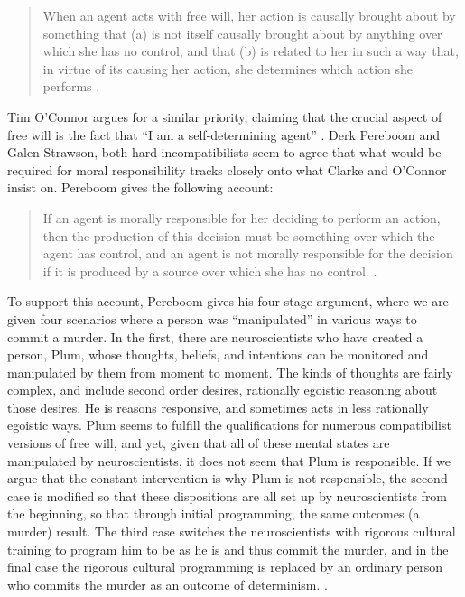 \documentclass[phd,12pt,oneside,paper=letterpaper]{ubcthesis}
\begin{document}
\begin{quote}
When an agent acts with free will, her action is causally brought about by something that (a)  is not itself causally brought about by anything over which she has no control, and that (b) is related to her in such a way that, in virtue of its causing her action, she determines which action she performs \citep{clarke1993}.
\end{quote}

Tim O'Connor argues for a similar priority, claiming that the crucial aspect of free will is the fact that ``I am a self-determining agent'' \citep[p.210]{oconnor2005}. Derk Pereboom and Galen Strawson, both hard incompatibilists seem to agree that what would be required for moral responsibility tracks closely onto what Clarke and O'Connor insist on. Pereboom gives the following account:

\begin{quote}
If an agent is morally responsible for her deciding to perform an action, then the production of this decision must be something over which the agent has control, and an agent is not morally responsible for the decision if it is produced by a source over which she has no control. \citep{pereboom2001}.
\end{quote}

To support this account, Pereboom gives his four-stage argument, where we are given four scenarios where a person was ``manipulated'' in various ways to commit a murder. In the first, there are neuroscientists who have created a person, Plum, whose thoughts, beliefs, and intentions can be monitored and manipulated by them from moment to moment. The kinds of thoughts are fairly complex, and include second order desires, rationally egoistic reasoning about those desires. He is reasons responsive, and sometimes acts in less rationally egoistic ways. Plum seems to fulfill the qualifications for numerous compatibilist versions of free will, and yet, given that all of these mental states are manipulated by neuroscientists, it does not seem that Plum is responsible. If we argue that the constant intervention is why Plum is not responsible, the second case is modified so that these dispositions are all set up by neuroscientists from the beginning, so that through initial programming, the same outcomes (a murder) result. The third case switches the neuroscientists with rigorous cultural training to program him to be as he is and thus commit the murder, and in the final case the rigorous cultural programming is replaced by an ordinary person who commits the murder as an outcome of determinism. \citep[p.112-6]{pereboom2001}. 
\end{document}
